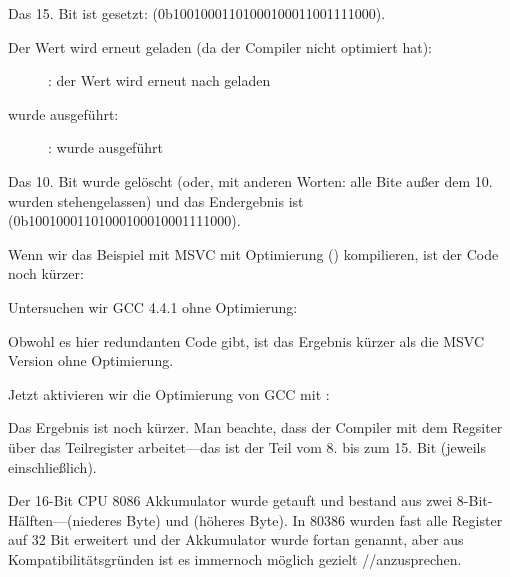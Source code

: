 Das 15. Bit ist gesetzt:  
(0b10010001101000{\color{red}1}00011001111000).

\clearpage
Der Wert wird erneut geladen (da der Compiler nicht optimiert hat):

\begin{figure}[H]
\centering
{}
\caption{\olly: der Wert wird erneut nach \EDX geladen}
\label{fig:set_reset_olly3}
\end{figure}

\clearpage
\AND wurde ausgeführt:

\begin{figure}[H]
\centering
{}
\caption{\olly: \AND wurde ausgeführt}
\label{fig:set_reset_olly4}
\end{figure}
Das 10. Bit wurde gelöscht (oder, mit anderen Worten: alle Bite außer dem 10.
wurden stehengelassen) und das Endergebnis ist\\
 (0b1001000110100010001{\color{red}0}001111000).


Wenn wir das Beispiel mit MSVC mit Optimierung (\Ox) kompilieren, ist der Code
noch kürzer:




Untersuchen wir GCC 4.4.1 ohne Optimierung:


Obwohl es hier redundanten Code gibt, ist das Ergebnis kürzer als die MSVC
Version ohne Optimierung.

Jetzt aktivieren wir die Optimierung von GCC mit \Othree: 




Das Ergebnis ist noch kürzer.
Man beachte, dass der Compiler mit dem \EAX Regsiter über das Teilregister \AH
arbeitet---das ist der Teil vom 8. bis zum 15. Bit (jeweils einschließlich).


Der 16-Bit CPU 8086 Akkumulator wurde \AX getauft und bestand aus zwei
8-Bit-Hälften---\AL (niederes Byte) und \AH (höheres Byte).
In 80386 wurden fast alle Register auf 32 Bit erweitert und der Akkumulator
wurde fortan \EAX genannt, aber aus Kompatibilitätsgründen ist es immernoch
möglich gezielt \AX/\AH/\AL anzusprechen.

